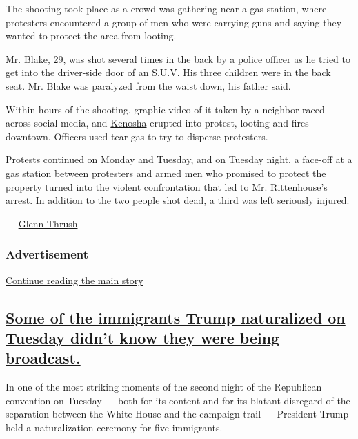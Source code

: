 The shooting took place as a crowd was gathering near a gas station,
where protesters encountered a group of men who were carrying guns and
saying they wanted to protect the area from looting.

Mr. Blake, 29, was
\href{https://www.nytimes3xbfgragh.onion/2020/08/24/us/kenosha-police-shooting.html}{shot
several times in the back by a police officer} as he tried to get into
the driver-side door of an S.U.V. His three children were in the back
seat. Mr. Blake was paralyzed from the waist down, his father said.

Within hours of the shooting, graphic video of it taken by a neighbor
raced across social media, and
\href{https://www.nytimes3xbfgragh.onion/2020/08/25/us/jacob-blake-kenosha-fires.html}{Kenosha}
erupted into protest, looting and fires downtown. Officers used tear gas
to try to disperse protesters.

Protests continued on Monday and Tuesday, and on Tuesday night, a
face-off at a gas station between protesters and armed men who promised
to protect the property turned into the violent confrontation that led
to Mr. Rittenhouse's arrest. In addition to the two people shot dead, a
third was left seriously injured.

--- \href{https://www.nytimes3xbfgragh.onion/by/glenn-thrush}{Glenn
Thrush}

\hypertarget{advertisement-6}{%
\subsubsection{Advertisement}\label{advertisement-6}}

\protect\hyperlink{after-dfp-ad-mid7}{Continue reading the main story}

\hypertarget{some-of-the-immigrants-trump-naturalized-on-tuesday-didnt-know-they-were-being-broadcast}{%
\subsection{\texorpdfstring{\protect\hyperlink{some-of-the-immigrants-trump-naturalized-on-tuesday-didnt-know-they-were-being-broadcast}{Some
of the immigrants Trump naturalized on Tuesday didn't know they were
being
broadcast.}}{Some of the immigrants Trump naturalized on Tuesday didn't know they were being broadcast.}}\label{some-of-the-immigrants-trump-naturalized-on-tuesday-didnt-know-they-were-being-broadcast}}

In one of the most striking moments of the second night of the
Republican convention on Tuesday --- both for its content and for its
blatant disregard of the separation between the White House and the
campaign trail --- President Trump held a naturalization ceremony for
five immigrants.

